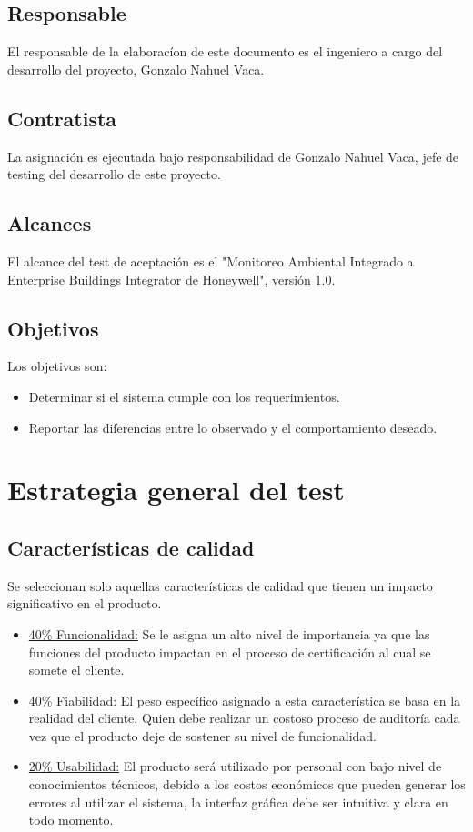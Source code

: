 \documentclass[
11pt,
spanish,
singlespacing,
parskip, 
headsepline,
a4paper
]{article}
\begin{document}
\subsection{Responsable}
El responsable de la elaboracíon de este documento es el ingeniero a cargo del desarrollo del proyecto, Gonzalo Nahuel Vaca.

\subsection{Contratista}
La asignación es ejecutada bajo responsabilidad de Gonzalo Nahuel Vaca, jefe de testing del desarrollo de este proyecto.

\subsection{Alcances}
El alcance del test de aceptación es el "Monitoreo Ambiental Integrado a Enterprise Buildings Integrator de Honeywell", versión 1.0.

\subsection{Objetivos}
Los objetivos son:
\begin{itemize}
\item Determinar si el sistema cumple con los requerimientos.
\item Reportar las diferencias entre lo observado y el comportamiento deseado.
\end{itemize}

\section{Estrategia general del test}

\subsection{Características de calidad}
Se seleccionan solo aquellas características de calidad que tienen un impacto significativo en el producto.
\begin{itemize}
\item \underline{40\% Funcionalidad:} Se le asigna un alto nivel de importancia ya que las funciones del producto impactan en el proceso de certificación al cual se somete el cliente.
\item \underline{40\% Fiabilidad:} El peso específico asignado a esta característica se basa en la realidad del cliente. Quien debe realizar un costoso proceso de auditoría cada vez que el producto deje de sostener su nivel de funcionalidad. 
\item \underline{20\% Usabilidad:} El producto será utilizado por personal con bajo nivel de conocimientos técnicos, debido a los costos económicos que pueden generar los errores al utilizar el sistema, la interfaz gráfica debe ser intuitiva y clara en todo momento. 
\end{itemize}
\end{document}
